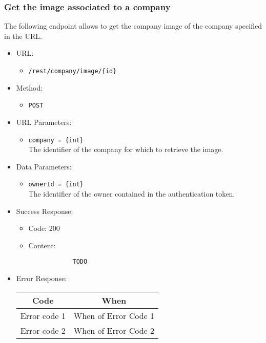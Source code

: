 \subsubsection*{Get the image associated to a company}

The following endpoint allows to get the company image of the company specified in the URL.

\begin{itemize}
    
    \item URL: 
    \begin{itemize}
        \item \texttt{/rest/company/image/\{id\}}
    \end{itemize}
    
    \item Method: 
    \begin{itemize}
        \item \texttt{POST}
    \end{itemize}
    
    \item URL Parameters: 
    \begin{itemize}
        \item \texttt{company = \{int\}} \\
        The identifier of the company for which to retrieve the image.
    \end{itemize}
    \item Data Parameters: 
    \begin{itemize}
        \item \texttt{ownerId = \{int\}} \\
        The identifier of the owner contained in the authentication token.
    \end{itemize}
    
    \item Success Response: 
    \begin{itemize}
        \item Code: 200
        \item Content:
        \begin{lstlisting}
            TODO
        \end{lstlisting}    
    \end{itemize}
    
    \item Error Response:
    \begin{table}[!h]
    \centering 
    \begin{tabular}{|c|c|}
    \hline
    \multicolumn{1}{|c|}{\textbf{Code}} & \multicolumn{1}{c|}{\textbf{When}} \\ \hline
    Error code 1 & When of Error Code 1 \\\hline
    Error code 2 & When of Error Code 2 \\\hline
    \end{tabular} 
    \end{table} 
    
\end{itemize}


